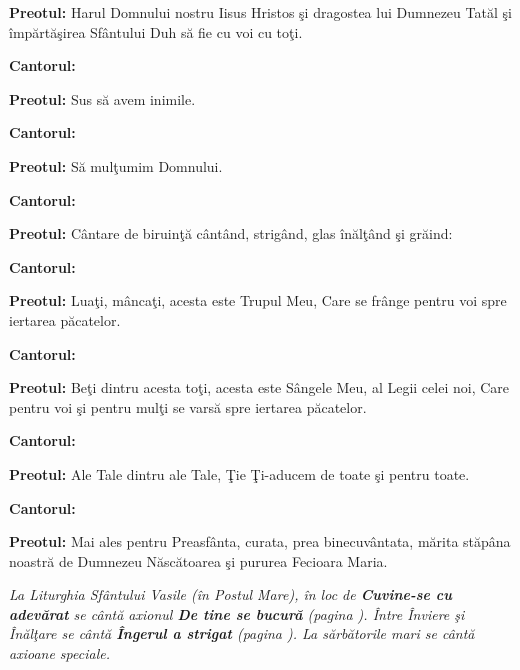 \documentclass[11pt,letterpaper]{book} \usepackage{ucs}
\begin{document}
  {\bf Preotul:} Harul Domnului nostru Iisus Hristos şi dragostea lui
  Dumnezeu Tatăl şi împărtăşirea Sfântului Duh să fie cu voi cu toţi.

  {\bf Cantorul:}
  \begin{center}
  \end{center}

  {\bf Preotul:} Sus să avem inimile.

  {\bf Cantorul:}
  \begin{center}
  \end{center}

  {\bf Preotul:} Să mulţumim Domnului.

  {\bf Cantorul:}
  \begin{center}
  \end{center}

  {\bf Preotul:} Cântare de biruinţă cântând, strigând, glas înălţând
  şi grăind:

  {\bf Cantorul:}
  \begin{center}
  \end{center}

  {\bf Preotul:} Luaţi, mâncaţi, acesta este Trupul Meu, Care se
  frânge pentru voi spre iertarea păcatelor.

  {\bf Cantorul:}
  \begin{center}
  \end{center}  

  {\bf Preotul:} Beţi dintru acesta toţi, acesta este Sângele Meu, al
  Legii celei noi, Care pentru voi şi pentru mulţi se varsă spre
  iertarea păcatelor.

  {\bf Cantorul:}
  \begin{center}
  \end{center}

  {\bf Preotul:} Ale Tale dintru ale Tale, Ţie Ţi-aducem de toate şi
  pentru toate.

  {\bf Cantorul:}


  {\bf Preotul:} Mai ales pentru Preasfânta, curata, prea
  binecuvântata, mărita stăpâna noastră de Dumnezeu Născătoarea şi
  pururea Fecioara Maria.

  {\em La Liturghia Sfântului Vasile (în Postul Mare), în loc de {\bf
  Cuvine-se cu adevărat} se cântă axionul {\bf De tine se bucură}
  (pagina \pageref{de_tine_se_bucura}). Între Înviere şi Înălţare se
  cântă {\bf Îngerul a strigat} (pagina
  \pageref{ingerul_a_strigat}). La sărbătorile mari se cântă axioane
  speciale.}
\end{document}
